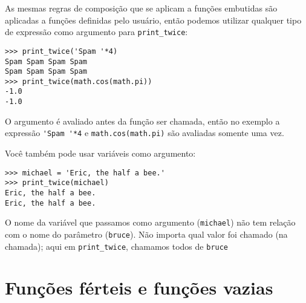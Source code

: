 As mesmas regras de composição que se aplicam a funções embutidas são
aplicadas a funções definidas pelo usuário, então podemos utilizar
qualquer tipo de expressão como argumento para \verb"print_twice":


\beforeverb
\begin{verbatim}
>>> print_twice('Spam '*4)
Spam Spam Spam Spam
Spam Spam Spam Spam
>>> print_twice(math.cos(math.pi))
-1.0
-1.0
\end{verbatim}
\afterverb
%

O argumento é avaliado antes da função ser chamada, então no exemplo
a expressão \verb"'Spam '*4" e {\tt math.cos(math.pi)} são avaliadas
somente uma vez.



Você também pode usar variáveis como argumento:

\beforeverb
\begin{verbatim}
>>> michael = 'Eric, the half a bee.'
>>> print_twice(michael)
Eric, the half a bee.
Eric, the half a bee.
\end{verbatim}
\afterverb
%

O nome da variável que passamos como argumento ({\tt michael}) não tem
relação com o nome do parâmetro ({\tt bruce}). Não importa qual valor foi
chamado (na chamada); aqui em \verb"print_twice", chamamos todos de {\tt bruce}

\section{Funções férteis e funções vazias}


